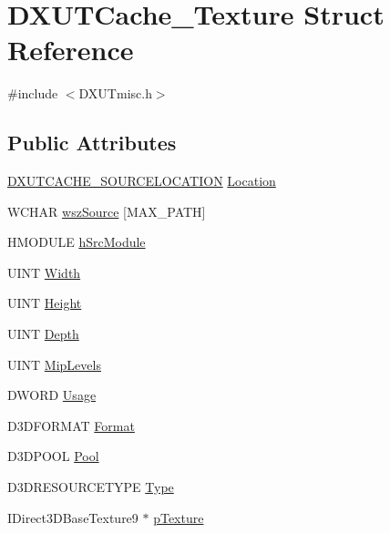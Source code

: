\hypertarget{struct_d_x_u_t_cache___texture}{
\section{DXUTCache\_\-Texture Struct Reference}
\label{struct_d_x_u_t_cache___texture}
}


{\ttfamily \#include $<$DXUTmisc.h$>$}\subsection*{Public Attributes}
\begin{DoxyCompactItemize}
\item 
\hyperlink{_d_x_u_tmisc_8h_a76e8535d530eae9300822134c181e733}{DXUTCACHE\_\-SOURCELOCATION} \hyperlink{struct_d_x_u_t_cache___texture_a6c3eaa5b8daece02e1d6dd7d25c5b07b}{Location}
\item 
WCHAR \hyperlink{struct_d_x_u_t_cache___texture_a2ef863de08edcc49d9b0c860a72105b7}{wszSource} \mbox{[}MAX\_\-PATH\mbox{]}
\item 
HMODULE \hyperlink{struct_d_x_u_t_cache___texture_a07369d4ea106a4a0780c81e8e6c4d7be}{hSrcModule}
\item 
UINT \hyperlink{struct_d_x_u_t_cache___texture_a6d09b8c5fda282163eae7f42f9a3b0b9}{Width}
\item 
UINT \hyperlink{struct_d_x_u_t_cache___texture_a83b1f09e46adc2179ce422afe4221554}{Height}
\item 
UINT \hyperlink{struct_d_x_u_t_cache___texture_a0ee63f98691312bf1da4d84196192a4c}{Depth}
\item 
UINT \hyperlink{struct_d_x_u_t_cache___texture_a74815def3a731c1f8f91671d2911da56}{MipLevels}
\item 
DWORD \hyperlink{struct_d_x_u_t_cache___texture_a62b5039d2484ee1957f7742545e61afc}{Usage}
\item 
D3DFORMAT \hyperlink{struct_d_x_u_t_cache___texture_a999124a25f441a76c5c9df9ffa8ebd3f}{Format}
\item 
D3DPOOL \hyperlink{struct_d_x_u_t_cache___texture_ae08c2f8171241e38e1e0137ccf6315a2}{Pool}
\item 
D3DRESOURCETYPE \hyperlink{struct_d_x_u_t_cache___texture_a7ae45cc28d48e8d8d8051511fe404262}{Type}
\item 
IDirect3DBaseTexture9 $\ast$ \hyperlink{struct_d_x_u_t_cache___texture_ac776b61763c8a6d71e5b250f5aa2d4a4}{pTexture}
\end{DoxyCompactItemize}


